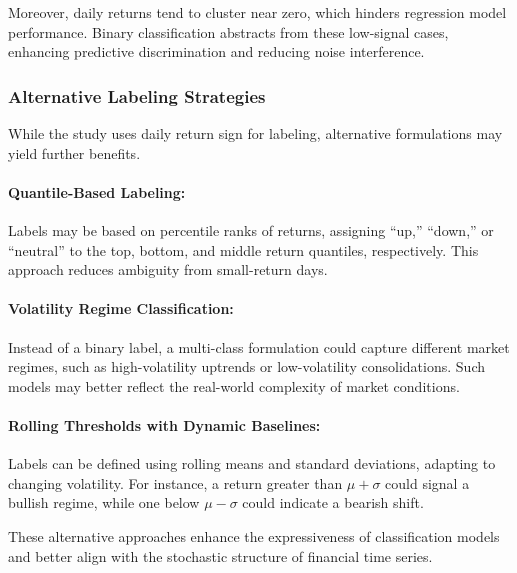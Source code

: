 Moreover, daily returns tend to cluster near zero, which hinders regression model performance. Binary classification abstracts from these low-signal cases, enhancing predictive discrimination and reducing noise interference.

\subsubsection{Alternative Labeling Strategies}

While the study uses daily return sign for labeling, alternative formulations may yield further benefits.

\paragraph{Quantile-Based Labeling:} Labels may be based on percentile ranks of returns, assigning “up,” “down,” or “neutral” to the top, bottom, and middle return quantiles, respectively. This approach reduces ambiguity from small-return days.

\paragraph{Volatility Regime Classification:} Instead of a binary label, a multi-class formulation could capture different market regimes, such as high-volatility uptrends or low-volatility consolidations. Such models may better reflect the real-world complexity of market conditions.

\paragraph{Rolling Thresholds with Dynamic Baselines:} Labels can be defined using rolling means and standard deviations, adapting to changing volatility. For instance, a return greater than $\mu + \sigma$ could signal a bullish regime, while one below $\mu - \sigma$ could indicate a bearish shift.

These alternative approaches enhance the expressiveness of classification models and better align with the stochastic structure of financial time series.

